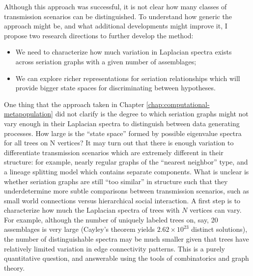 Although this approach was successful, it is not clear how many classes of transmission scenarios can be distinguished.  To understand how generic the approach might be, and what additional developments might improve it, I propose two research directions to further develop the method:

\begin{itemize}
    \item We need to characterize how much variation in Laplacian spectra exists across seriation graphs with a given number of assemblages;
    \item We can explore richer representations for seriation relationships which will provide bigger state spaces for discriminating between hypotheses.
\end{itemize}

One thing that the approach taken in Chapter \ref{chap:computational-metapopulation} did not clarify is the degree to which seriation graphs might not vary enough in their Laplacian spectra to distinguish between data generating processes.  How large is the ``state space'' formed by possible eigenvalue spectra for all trees on N vertices?  It may turn out that there is enough variation to differentiate transmission scenarios which are extremely different in their structure:  for example, nearly regular graphs of the ``nearest neighbor'' type, and a lineage splitting model which contains separate components.  What is unclear is whether seriation graphs are still ``too similar'' in structure such that they underdetermine more subtle comparisons between transmission scenarios, such as small world connections versus hierarchical social interaction.  A first step is to characterize how much the Laplacian spectra of trees with $N$ vertices can vary.  For example, although the number of uniquely labeled trees on, say, 20 assemblages is very large (Cayley's theorem yields $2.62 \times 10^{23}$ distinct solutions), the number of distinguishable spectra may be much smaller given that trees have relatively limited variation in edge connectivity patterns.  This is a purely quantitative question, and answerable using the tools of combinatorics and graph theory.  


